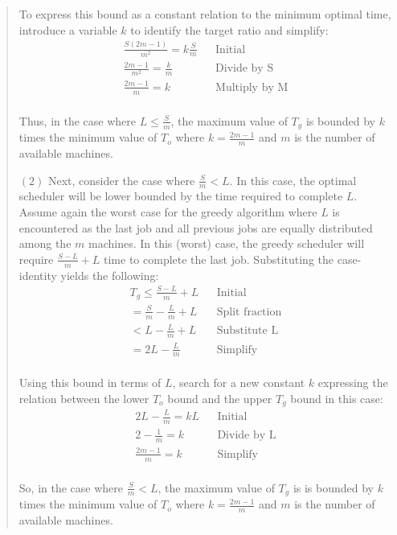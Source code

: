 \documentclass[11pt]{article}
\begin{document}
\begin{enumerate}
\begin{enumerate}
\begin{quote}
To express this bound as a constant relation to the minimum optimal time, introduce a variable $k$ to identify the target ratio and simplify:
  \begin{align*}
      && \frac{S(2m - 1)}{m^2} = k\frac{S}{m} && \text{Initial} && \\
      && \frac{2m - 1}{m^2} = \frac{k}{m} && \text{Divide by S} && \\
      && \frac{2m - 1}{m} = k && \text{Multiply by M} && \\
  \end{align*} 

  Thus, in the case where $L \leq \frac{S}{m}$, the maximum value of $T_g$ is bounded by $k$ times the minimum value of $T_o$ where $k = \frac{2m - 1}{m}$ and $m$ is the number of available machines.

  \medskip
  $(2)$ Next, consider the case where $\frac{S}{m} < L$. In this case, the optimal scheduler will be lower bounded by the time required to complete $L$. Assume again the worst case for the greedy algorithm where $L$ is encountered as the last job and all previous jobs are equally distributed among the $m$ machines. In this (worst) case, the greedy scheduler will require $\frac{S - L}{m} + L$ time to complete the last job. Substituting the case-identity yields the following:
  \begin{align*}
      && T_g \leq \frac{S - L}{m} + L && \text{Initial} && \\
      && = \frac{S}{m} - \frac{L}{m} + L && \text{Split fraction} && \\
      && < L - \frac{L}{m} + L && \text{Substitute L} && \\
      && = 2L - \frac{L}{m} && \text{Simplify} && \\
  \end{align*} 

Using this bound in terms of $L$, search for a new constant $k$ expressing the relation between the lower $T_o$ bound and the upper $T_g$ bound in this case:
  \begin{align*}
      && 2L - \frac{L}{m} = kL && \text{Initial} && \\
      && 2 - \frac{1}{m} = k && \text{Divide by L} && \\
      && \frac{2m - 1}{m} = k && \text{Simplify} && \\
  \end{align*} 

  So, in the case where $\frac{S}{m} < L$, the maximum value of $T_g$ is is bounded by $k$ times the minimum value of $T_o$ where $k = \frac{2m - 1}{m}$ and $m$ is the number of available machines.


\end{quote}
\end{enumerate}
\end{enumerate}
\end{document}

